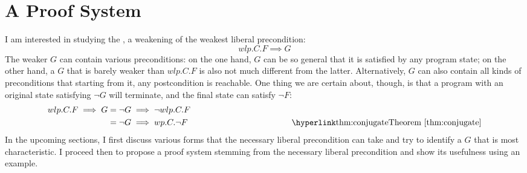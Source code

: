 \chapter{A Proof System}\label{ch:system} %





I am interested in studying the , a weakening of the weakest liberal precondition: 
$$wlp.C.F\implies G$$
The weaker $G$ can contain various preconditions: on the one hand, $G$ can be so general that it is satisfied by any program state; on the other hand, a $G$ that is barely weaker than $wlp.C.F$ is also not much different from the latter. 
Alternatively, $G$ can also contain all kinds of preconditions that starting from it, any postcondition is reachable. 
One thing we are certain about, though, is that a program with an original state satisfying $\neg G$ will terminate, and the final state can satisfy $\neg F$: 
\begin{align*}
wlp.C.F\implies G & = \neg G \implies \neg wlp.C.F \\
	& = \neg G \implies wp.C.\neg F 
	\hspace{0.3\textwidth} \tag*{\thm{conjugate}}
\end{align*}
In the upcoming sections, I first discuss various forms that the necessary liberal precondition can take and try to identify a $G$ that is most characteristic. 
I proceed then to propose a proof system stemming from the necessary liberal precondition and show its usefulness using an example. 

